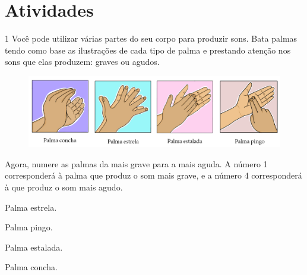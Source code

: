 
\section*{Atividades}

\num{1} Você pode utilizar várias partes do seu corpo para produzir sons.
Bata palmas tendo como base as ilustrações de cada tipo de palma e
prestando atenção nos sons que elas produzem: graves ou agudos.

\begin{figure}[htpb!]
\includegraphics[width=\textwidth]{../ilustracoes/ART5/SAEB_5ANO_ART_FIGURA1.png}
\end{figure}

\noindent{}Agora, numere as palmas da mais grave para a mais aguda. A número 1
corresponderá à palma que produz o som mais grave, e a número 4 corresponderá à que
produz o som mais agudo.\bigskip

\begin{minipage}{.5\textwidth}
\begin{boxlist}
 Palma estrela.

 Palma pingo.

 Palma estalada.

 Palma concha.
\end{boxlist}
\end{minipage}

